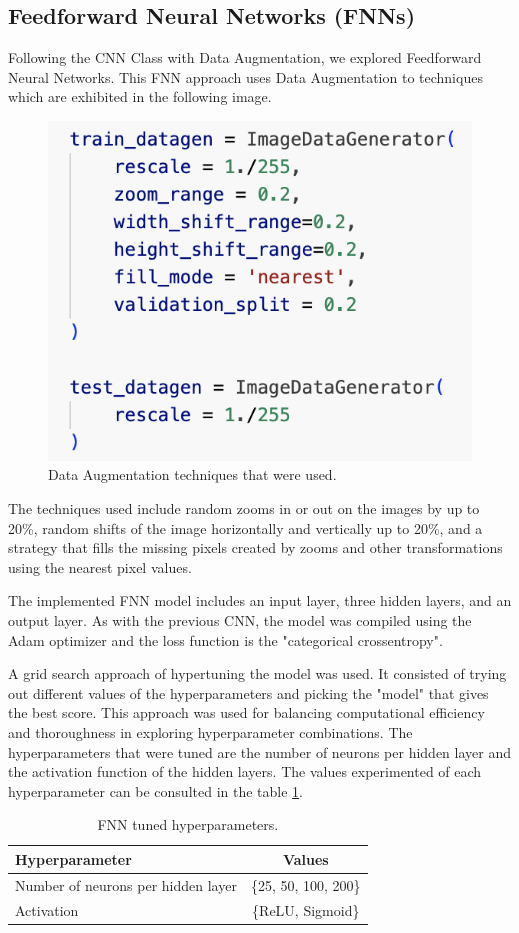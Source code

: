 \subsection{Feedforward Neural Networks (FNNs)}
Following the CNN Class with Data Augmentation, we explored Feedforward Neural Networks. This FNN approach uses Data Augmentation to techniques which are exhibited in the following image.
\begin{figure}[H]
    \centering
    \includegraphics[width=0.5\linewidth]{images/fnn_data_aug.png}
    \caption{Data Augmentation techniques that were used.}
    \label{fig:FNN_data_aug}
\end{figure}
The techniques used include random zooms in or out on the images by up to 20\%, random shifts of the image horizontally and vertically up to 20\%, and a strategy that fills the missing pixels created by zooms and other transformations using the nearest pixel values.

The implemented FNN model includes an input layer, three hidden layers, and an output layer. As with the previous CNN, the model was compiled using the Adam optimizer and the loss function is the "categorical crossentropy".

A grid search approach of hypertuning the model was used. It consisted of trying out different values of the hyperparameters and picking the "model" that gives the best score. This approach was used for balancing computational efficiency and thoroughness in exploring hyperparameter combinations. The hyperparameters that were tuned are the number of neurons per hidden layer and the activation function of the hidden layers. The values experimented of each hyperparameter can be consulted in the table \ref{tab:fnn_hypertuning}.

\begin{table}[H]
\centering
\caption{FNN tuned hyperparameters.}
\begin{tabular}{|l|c|}
\hline
\textbf{Hyperparameter} & \textbf{Values} \\ \hline
Number of neurons per hidden layer & \{25, 50, 100, 200\} \\ \hline
Activation & \{ReLU, Sigmoid\} \\ \hline
\end{tabular}
\label{tab:fnn_hypertuning}
\end{table}

